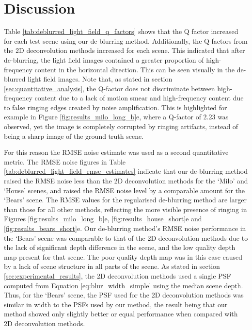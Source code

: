 \section{Discussion}
\label{sec:discussion}

Table \ref{tab:deblurred_light_field_q_factors} shows that the Q factor increased for each test scene using our de-blurring method.
Additionally, the Q-factors from the 2D deconvolution methods increased for each scene.
This indicated that after de-blurring, the light field images contained a greater proportion of high-frequency content in the horizontal direction.
This can be seen visually in the de-blurred light field images.
Note that, as stated in section \ref{sec:quantitative_analysis}, the Q-factor does not discriminate between high-frequency content due to a lack of motion smear and high-frequency content due to false ringing edges created by noise amplification.
This is highlighted for example in Figure \ref{fig:results_milo_long_b}e, where a Q-factor of 2.23 was observed, yet the image is completely corrupted by ringing artifacts, instead of being a sharp image of the ground truth scene.

For this reason the RMSE noise estimate was used as a second quantitative metric.
The RMSE noise figures in Table \ref{tab:deblurred_light_field_rmse_estimates} indicate that our de-blurring method raised the RMSE noise less than the 2D deconvolution methods for the \enquote*{Milo} and \enquote*{House} scenes, and raised the RMSE noise level by a comparable amount for the \enquote*{Bears} scene.
The RMSE values for the regularised de-blurring method are larger than those for all other methods, reflecting the more visible presence of ringing in Figures \ref{fig:results_milo_long_b}e, \ref{fig:results_house_short}e and \ref{fig:results_bears_short}e.
Our de-blurring method's RMSE noise performance in the \enquote*{Bears} scene was comparable to that of the 2D deconvolution methods due to the lack of significant depth difference in the scene, and the low quality depth map present for that scene.
The poor quality depth map was in this case caused by a lack of scene structure in all parts of the scene.
As stated in section \ref{sec:experimental_results}, the 2D deconvolution methods used a single PSF computed from Equation \ref{eq:blur_width_simple} using the median scene depth.
Thus, for the \enquote*{Bears} scene, the PSF used for the 2D deconvolution methods was similar in width to the PSFs used by our method, the result being that our method showed only slightly better or equal performance when compared with 2D deconvolution methods.


